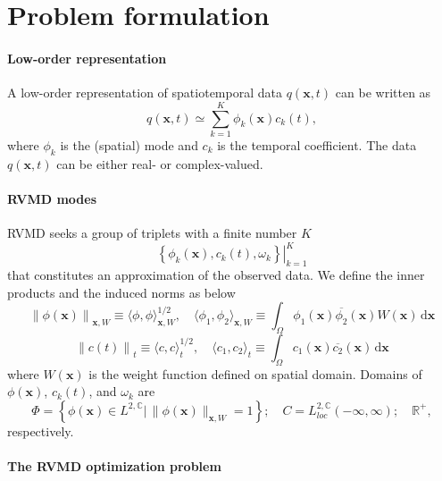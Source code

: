 \documentclass[12pt]{article}
\numberwithin{equation}{section}
\begin{document}
\section{Problem formulation}

\paragraph{Low-order representation}
A low-order representation of spatiotemporal data $q(\bm{x},t)$ can be written as
\begin{equation}
	q(\bm{x},t)\simeq \sum_{k=1}^{K}\phi_k(\bm{x})c_k(t),
\end{equation}
where $\phi_k$ is the (spatial) mode and $c_k$ is the temporal coefficient.
The data $q(\bm{x},t)$ can be either real- or complex-valued.

\paragraph{RVMD modes}
RVMD seeks a group of triplets with a finite number $K$
\begin{equation}
	\left.\left\{\phi_k(\bm{x}),c_k(t),\omega_k\right\}\right|_{k=1}^K
\end{equation}
that constitutes an approximation of the observed data.
We define the inner products and the induced norms as below
\begin{equation}
	\left\|\phi(\bm{x})\right\|_{\bm{x},W}\equiv \langle\phi,\phi\rangle_{\bm{x},W}^{1/2},\quad \langle\phi_1,\phi_2\rangle_{\bm{x},W}\equiv\int_\Omega \phi_1(\bm{x}) \overline{\phi_2}(\bm{x}) W(\bm{x})\,\mathrm{d}\bm{x}
\end{equation}
\begin{equation}
	\left\|c(t)\right\|_{t}\equiv \langle c, c\rangle_{t}^{1/2},\quad \langle c_1, c_2\rangle_{t}\equiv\int_\Omega  c_1(\bm{x}) \overline{ c_2}(\bm{x})\,\mathrm{d}\bm{x}
\end{equation}
where $W(\bm{x})$ is the weight function defined on spatial domain.
Domains of $\phi(\bm{x})$, $c_k(t)$, and $\omega_k$ are 
\begin{equation}
	\Phi=\left\{\phi(\bm{x})\in L^{2,\mathbb{C}}\big|\,\|\phi(\bm{x})\|_{\bm{x},W}=1\right\};\quad
	C=L_{loc}^{2,\mathbb{C}}(-\infty,\infty);\quad
	\mathbb{R}^+,
\end{equation}
respectively.

\paragraph{The RVMD optimization problem}
\end{document}
